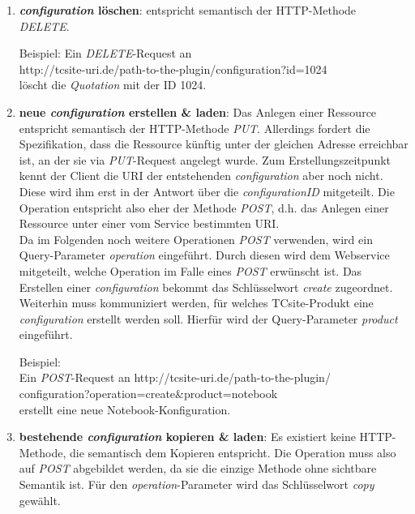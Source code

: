 \documentclass[11pt, a4paper, titlepage, listof=totoc, bibliography=totoc, index=totoc, twoside, openright, headings=normal, draft]{scrreprt}
\begin{document}
\begin{enumerate}
\item \textbf{\emph{configuration} löschen}: entspricht semantisch der HTTP-Methode \emph{DELETE}. 
\begin{addmargin}[25pt]{0pt} 
Beispiel: Ein \emph{DELETE}-Request an\\
\glqq http://tcsite-uri.de/path-to-the-plugin/configuration?id=1024\grqq{}
\\löscht die \emph{Quotation} mit der ID 1024.
\end{addmargin}
\item \textbf{neue \emph{configuration} erstellen \& laden}: Das Anlegen einer Ressource entspricht semantisch der HTTP-Methode \emph{PUT}. Allerdings fordert die Spezifikation, dass die Ressource künftig unter der gleichen Adresse erreichbar ist, an der sie via \emph{PUT}-Request angelegt wurde. Zum Erstellungszeitpunkt kennt der Client die URI der entstehenden \emph{configuration} aber noch nicht. Diese wird ihm erst in der Antwort über die \emph{configurationID} mitgeteilt. Die Operation entspricht also eher der Methode \emph{POST}, d.h. das Anlegen einer Ressource unter einer vom Service bestimmten URI.\\Da im Folgenden noch weitere Operationen \emph{POST} verwenden, wird ein Query-Parameter \emph{operation} eingeführt. Durch diesen wird dem Webservice mitgeteilt, welche Operation im Falle eines \emph{POST} erwünscht ist. Das Erstellen einer \emph{configuration} bekommt das Schlüsselwort \emph{create} zugeordnet. Weiterhin muss kommuniziert werden, für welches TCsite-Produkt eine \emph{configuration} erstellt werden soll. Hierfür wird der Query-Parameter \emph{product} eingeführt.
\begin{addmargin}[25pt]{0pt} 
Beispiel:
\\Ein \emph{POST}-Request an \glqq http://tcsite-uri.de/path-to-the-plugin/
\\configuration?operation=create\&product=notebook\grqq{}\\
erstellt eine neue Notebook-Konfiguration.
\end{addmargin}
\item \textbf{bestehende \emph{configuration} kopieren \& laden}: Es existiert keine HTTP-Methode, die semantisch dem Kopieren entspricht. Die Operation muss also auf \emph{POST} abgebildet werden, da sie die einzige Methode ohne sichtbare Semantik ist. Für den \emph{operation}-Parameter wird das Schlüsselwort \emph{copy} gewählt.
\begin{addmargin}[25pt]{0pt} 

\end{addmargin}
\end{enumerate}
\end{document}
